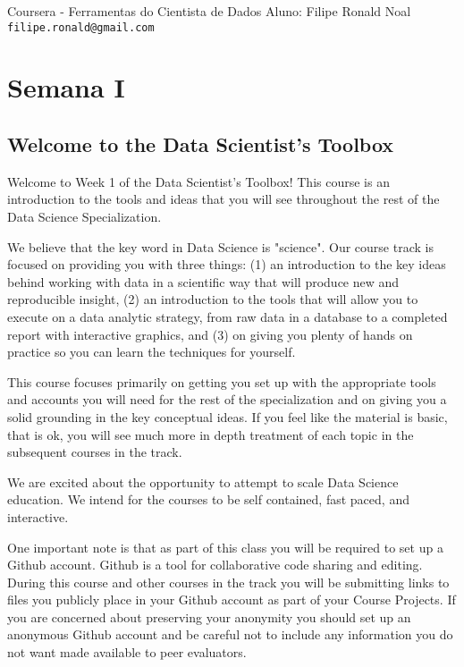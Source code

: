 \textsf{Coursera} - Ferramentas do Cientista de Dados
Aluno: Filipe Ronald Noal\\\texttt{filipe.ronald@gmail.com}

\def\r          {`\textsf{R}'}%


\section{Semana I}

\subsection{Welcome to the Data Scientist's Toolbox}

Welcome to Week 1 of the Data Scientist's Toolbox! This course is an introduction to the tools and ideas that you will see throughout the rest of the Data Science Specialization.

We believe that the key word in Data Science is "science". Our course track is focused on providing you with three things: (1) an introduction to the key ideas behind working with data in a scientific way that will produce new and reproducible insight, (2) an introduction to the tools that will allow you to execute on a data analytic strategy, from raw data in a database to a completed report with interactive graphics, and (3) on giving you plenty of hands on practice so you can learn the techniques for yourself.

This course focuses primarily on getting you set up with the appropriate tools and accounts you will need for the rest of the specialization and on giving you a solid grounding in the key conceptual ideas. If you feel like the material is basic, that is ok, you will see much more in depth treatment of each topic in the subsequent courses in the track.

We are excited about the opportunity to attempt to scale Data Science education. We intend for the courses to be self contained, fast paced, and interactive.

One important note is that as part of this class you will be required to set up a Github account. Github is a tool for collaborative code sharing and editing. During this course and other courses in the track you will be submitting links to files you publicly place in your Github account as part of your Course Projects. If you are concerned about preserving your anonymity you should set up an anonymous Github account and be careful not to include any information you do not want made available to peer evaluators.

